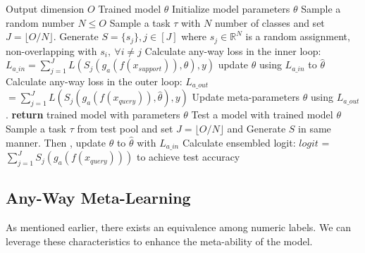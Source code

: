 \documentclass[letterpaper]{article} %
\newcommand{\jh}[1]{\textcolor{black}{#1}}
\begin{document}
\begin{algorithm*}
\caption{Any-Way Meta-Learning}\label{alg:AnyWayMetaLearning}
\begin{algorithmic}

\Require Output dimension $O$ %
\Ensure Trained model $\theta$
\State Initialize model parameters $\theta$
    \State Sample a random number $N \le O$
    \State Sample a task $\tau$ with $N$ number of classes and set $J = \lfloor O/N \rfloor$.
    \State Generate $S = \{s_j\}, j \in [J]$ where $s_j \in \mathbb{R}^N$ is a random assignment, non-overlapping with $s_i, \ \forall i\neq j$ 
    \State Calculate any-way loss in the inner loop: $L_{a\_in} = \sum_{j=1}^J L(S_j(g_a(f(x_{support})), \theta),y)$ 
    \State update  $\theta$ using $L_{a\_in}$ to $\hat{\theta}$
    \State Calculate any-way loss in the outer loop: $L_{a\_out}$ $=\sum_{j=1}^J L(S_j(g_a(f(x_{query})), \hat{\theta}),y)$
    \State Update meta-parameters $\theta$ using $L_{a\_out}$.
\EndFor
\State \textbf{return} trained model with parameters $\theta$
\Ensure Test a model with trained model $\theta$
\State Sample a task $\tau$ from test pool and set $J = \lfloor O/N \rfloor$ and Generate $S$ in same manner. Then , update $\theta$ to $\hat{\theta}$ with $L_{a\_in}$
\State Calculate ensembled logit: $logit$ = $\sum_{j=1}^J S_j(g_a(f(x_{query})))$ to achieve test accuracy
\end{algorithmic}
\end{algorithm*}

\subsection{Any-Way Meta-Learning}\label{sec:anywaymetalearning}
As mentioned earlier, there exists an equivalence among numeric labels. %
We can leverage
these characteristics to enhance the meta-ability of the model.
\end{document}
